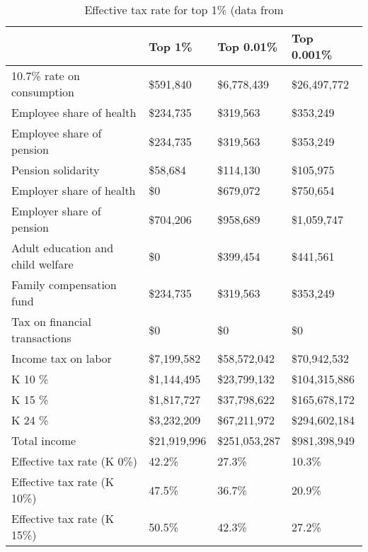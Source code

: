 \documentclass[12pt]{article}
\begin{document}
\begin{table}[]
\caption{Effective tax rate for top 1\% (data from \citet{juliana}}
\label{table:ttop}
\footnotesize
\begin{tabular}{llll} \hline
&Top 1\%                           & Top 0.01\%  & Top 0.001\%                  \\ \hline
10.7\% rate on consumption        & \$591,840                    & \$6,778,439   & \$26,497,772  \\
Employee share of health          & \$234,735                    & \$319,563     & \$353,249     \\
Employee share of pension         & \$234,735                    & \$319,563     & \$353,249     \\
Pension solidarity                & \$58,684                     & \$114,130     & \$105,975     \\
Employer share of health          & \$0                          & \$679,072     & \$750,654     \\
Employer share of pension         & \$704,206                    & \$958,689     & \$1,059,747   \\
Adult education and child welfare & \$0                          & \$399,454     & \$441,561     \\
Family compensation fund          & \$234,735                    & \$319,563     & \$353,249     \\
Tax on financial transactions     & \$0                          & \$0           & \$0           \\
Income tax on labor               & \$7,199,582                  & \$58,572,042  & \$70,942,532  \\
K 10 \%                           & \$1,144,495                  & \$23,799,132  & \$104,315,886 \\
K 15 \%                           & \$1,817,727                  & \$37,798,622  & \$165,678,172 \\
K 24 \%                           & \$3,232,209                  & \$67,211,972  & \$294,602,184 \\
Total income                      & \$21,919,996                 & \$251,053,287 & \$981,398,949 \\
Effective tax rate (K 0\%)        & 42.2\%                       & 27.3\%        & 10.3\%        \\
Effective tax rate (K 10\%)       & 47.5\%                       & 36.7\%        & 20.9\%        \\
Effective tax rate (K 15\%)       & 50.5\%                       & 42.3\%        & 27.2\%        \\

\end{tabular}
\end{table}
\end{document}
